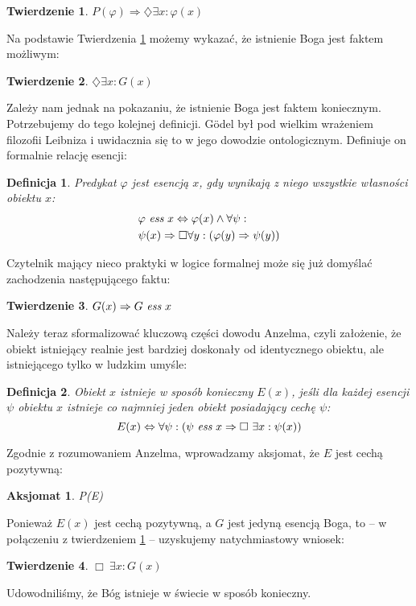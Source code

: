 \documentclass{eiti-raport}
\newtheorem{axiom}{Aksjomat}
\newtheorem{definition}{Definicja}
\newtheorem{theorem}{Twierdzenie}
\begin{document}
\begin{theorem} \label{th:godel1}
	$P(\varphi) \Rightarrow \diamondsuit \exists x: \varphi(x)$
\end{theorem}
Na podstawie Twierdzenia \ref{th:godel1} możemy wykazać, że istnienie Boga jest faktem możliwym:
\begin{theorem} \label{th:godel2}
	$\diamondsuit \exists x: G(x)$
\end{theorem}
Zależy nam jednak na pokazaniu, że istnienie Boga jest faktem koniecznym. Potrzebujemy do tego kolejnej definicji. G\"odel był pod wielkim wrażeniem filozofii Leibniza i uwidacznia się to w jego dowodzie ontologicznym. Definiuje on formalnie relację esencji:
\begin{definition}
	Predykat $\varphi$ jest \emph{esencją} $x$, gdy wynikają z niego wszystkie własności obiektu $x$:
	\begin{align*}
		& \varphi\ \emph{ess}\ x \Leftrightarrow \varphi(x) \wedge \forall \psi: \\ 
		& \psi(x) \Rightarrow \Box \forall y: \left( \varphi(y) \Rightarrow \psi(y) \right)
	\end{align*}
\end{definition}
Czytelnik mający nieco praktyki w logice formalnej może się już domyślać zachodzenia następującego faktu:
\begin{theorem}
	$G(x) \Rightarrow G\ \emph{ess}\ x$
\end{theorem}
Należy teraz sformalizować kluczową części dowodu Anzelma, czyli założenie, że obiekt istniejący realnie jest bardziej doskonały od identycznego obiektu, ale istniejącego tylko w ludzkim umyśle: 
\begin{definition}
	Obiekt $x$ istnieje w sposób konieczny $E(x)$, jeśli dla każdej esencji $\psi$ obiektu $x$ istnieje co najmniej jeden obiekt posiadający cechę $\psi$:
	\begin{equation*}
		E(x) \Leftrightarrow \forall \psi: \left( \psi\ \emph{ess}\ x \Rightarrow\Box\ \exists x: \psi(x) \right)
	\end{equation*}
\end{definition}
Zgodnie z rozumowaniem Anzelma, wprowadzamy aksjomat, że $E$ jest cechą pozytywną:
\begin{axiom}
	P(E)
\end{axiom}
Ponieważ $E(x)$ jest cechą pozytywną, a $G$ jest jedyną esencją Boga, to -- w połączeniu z twierdzeniem \ref{th:godel1} -- uzyskujemy natychmiastowy wniosek:
\begin{theorem} \label{th:goedel3}
	$\Box\ \exists x: G(x)$
\end{theorem}
Udowodniliśmy, że Bóg istnieje w świecie w sposób konieczny. 
\end{document}
